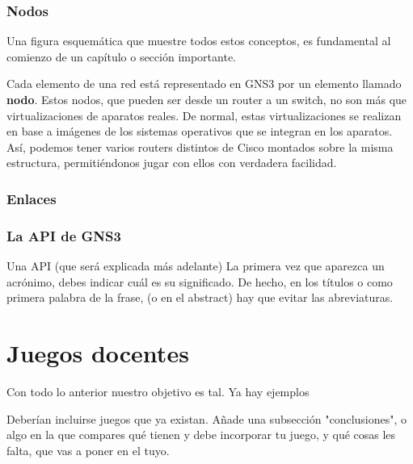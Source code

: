 \subsubsection{Nodos}
Una figura esquemática que muestre todos estos conceptos, es fundamental al comienzo de un capítulo o sección importante.

Cada elemento de una red está representado en GNS3 por un elemento llamado \textbf{nodo}. Estos nodos, que pueden ser desde un router a un switch, no son más que virtualizaciones de aparatos reales. De normal, estas virtualizaciones se realizan en base a imágenes de los sistemas operativos que se integran en los aparatos. Así, podemos tener varios routers distintos de Cisco montados sobre la misma estructura, permitiéndonos jugar con ellos con verdadera facilidad.

\subsubsection{Enlaces}

\subsubsection{La API de GNS3}
Una API (que será explicada más adelante)
La primera vez que aparezca un acrónimo, debes indicar cuál es su significado. De hecho, en los títulos o como primera palabra de la frase, (o en el abstract) hay que evitar las abreviaturas.

\section{Juegos docentes}
Con todo lo anterior nuestro objetivo es tal. Ya hay ejemplos



Deberían incluirse juegos que ya existan. Añade una subsección "conclusiones", o algo en la que compares qué tienen y debe incorporar tu juego, y qué cosas les falta, que vas a poner en el tuyo.